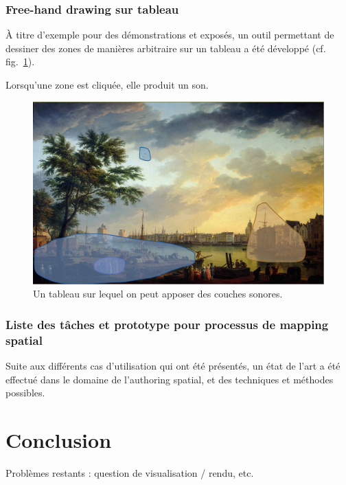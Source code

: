 \documentclass[french]{article}
\begin{document}
\subsubsection{Free-hand drawing sur tableau}
À titre d'exemple pour des démonstrations et exposés, un outil permettant de dessiner des zones de manières arbitraire sur un tableau a été développé (cf. fig.~\ref{fig.tableau}).

Lorsqu'une zone est cliquée, elle produit un son. %
\begin{figure}
\centering
\includegraphics[scale=0.2]{images/harbour.png}
\caption{Un tableau sur lequel on peut apposer des couches sonores.}
\label{fig.tableau}
\end{figure} 

\subsubsection{Liste des tâches et prototype pour processus de mapping spatial}
Suite aux différents cas d'utilisation qui ont été présentés, un état de l'art a été effectué dans le domaine de l'authoring spatial, et des techniques et méthodes possibles.


\section{Conclusion}

Problèmes restants : question de visualisation / rendu, etc.
\end{document}
